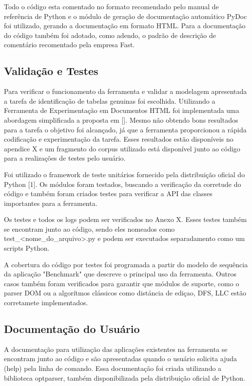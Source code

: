 \documentclass[12pt, a4paper]{article}
\begin{document}
Todo o código esta comentado no formato recomendado pelo manual de
referência de Python e o  módulo de geração de documentação automático
PyDoc foi utilizado, gerando a documentação em formato HTML. Para a
documentação do código também foi adotado, como adendo, o padrão de 
descrição de comentário recomentado pela empresa Fast.

\subsection{Validação e Testes}

Para verificar o funcionamento da ferramenta e validar a modelagem apresentada a tarefa de identificação de tabelas genuinas foi escolhida. Utilizando a Ferramenta de Experimentação em Documentos HTML foi implementada uma abordagem simplificada a proposta em []. Mesmo não obtendo bons resultados para a tarefa o objetivo foi alcançado, já que a ferramenta proporcionou a rápida codificação e experimentação da tarefa. Esses resultados estão disponíveis no apendice X e um fragmento do corpus utilizado está disponível junto ao código para a realizações de testes pelo usuário.

Foi utilizado o framework de teste unitários fornecido pela distribuição
oficial do Python [1]. Os módulos foram testados, buscando a verificação
da corretude do código e também foram criados testes para verificar a
API das classes importantes para a ferramenta.

Os testes e todos os logs podem ser verificados no Anexo X. Esses testes
também se encontram junto ao código, sendo eles nomeados como
test\_<nome\_do\_arquivo>.py e podem ser executados separadamento como
um scripts Python.

A cobertura do código por testes foi programada a partir do modelo de
sequência da aplicação "Benchmark" que descreve o principal uso da
ferramenta. Outros casos também foram verificados para garantir que
módulos de suporte, como o parser DOM ou a algorítmos clássicos como
distáncia de ediçao, DFS, LLC estão corretamete
implementados.

\subsection{Documentação do Usuário}

A documentação para utilização das aplicações existentes na ferramenta
se encontram junto ao código e são apresentadas quando o usuário
solicita ajuda (help) pela linha de comando. Essa documentação foi
criada utilizando a biblioteca optparser, também disponibilizada pela
distribuição oficial de Python.
\end{document}

